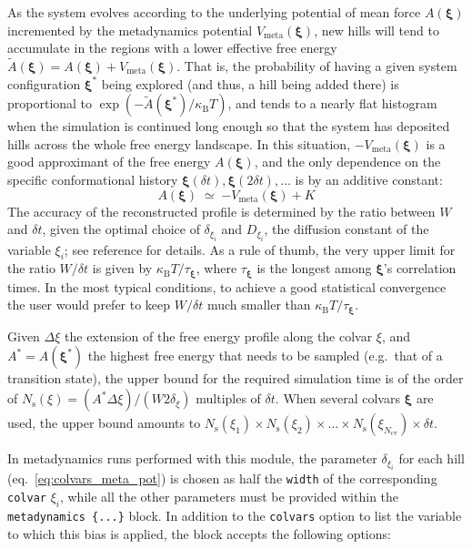 As the system evolves according to the underlying potential of mean
force $A(\bm{\xi})$ incremented by the metadynamics potential
$V_{\mathrm{meta}}(\bm{\xi})$, new hills will tend to accumulate in
the regions with a lower effective free energy $\tilde{A}(\bm{\xi}) =
A(\bm{\xi})+V_{\mathrm{meta}}(\bm{\xi})$.  That is, the probability of
having a given system configuration $\bm{\xi^{*}}$ being explored (and
thus, a hill being added there) is proportional to
$\exp\left(-\tilde{A}(\bm{\xi^{*}})/\kappa_{\mathrm{B}}T\right)$, and
tends to a nearly flat histogram when the simulation is continued long
enough so that the system has deposited hills across the whole free
energy landscape.  In this situation, $-V_{\mathrm{meta}}(\bm{\xi})$
is a good approximant of the free energy $A(\bm{\xi})$, and the only
dependence on the specific conformational history
$\bm{\xi}(\delta{}t), \bm{\xi}(2\delta{}t), \ldots$ is by an additive
constant:
\begin{equation}
  \label{eq:colvars_meta_fes}
  A(\bm{\xi}) \; \simeq \; {
    -V_{\mathrm{meta}}(\bm{\xi}) + K
  }
\end{equation}
The accuracy of the reconstructed profile is determined by the ratio
between $W$ and $\delta{}t$, given the optimal choice of
$\delta_{\xi_{i}}$ and $D_{\xi_{i}}$, the diffusion constant of the
variable $\xi_{i}$; see reference \cite{Bussi2006} for details.  As a
rule of thumb, the very upper limit for the ratio $W/\delta{}t$ is
given by $\kappa_{\mathrm{B}}T/\tau_{\bm{\xi}}$, where
$\tau_{\bm{\xi}}$ is the longest among $\bm{\xi}$'s correlation times.
In the most typical conditions, to achieve a good statistical
convergence the user would prefer to keep $W/\delta{}t$ much smaller
than $\kappa_{\mathrm{B}}T/\tau_{\bm{\xi}}$.

Given $\Delta\xi$ the extension of the free energy profile along the
colvar $\xi$, and $A^{*}=A(\bm{\xi}^{*})$ the highest free energy that
needs to be sampled (e.g.~that of a transition state), the upper bound
for the required simulation time is of the order of
$N_{\mathrm{s}}(\xi) = (A^{*}\Delta\xi)/(W2\delta_{\xi})$ multiples of
$\delta{}t$.  When several colvars $\bm{\xi}$ are used, the upper
bound amounts to $N_{\mathrm{s}}(\xi_{1}) \times
N_{\mathrm{s}}(\xi_{2}) \times \ldots \times
N_{\mathrm{s}}(\xi_{N_{\mathrm{cv}}}) \times \delta{}t$.

In metadynamics runs performed with this module, the parameter
$\delta_{\xi_{i}}$ for each hill (eq.~\ref{eq:colvars_meta_pot}) is
chosen as half the \texttt{width} of the corresponding \texttt{colvar}
$\xi_{i}$, while all the other parameters must be provided within the
\texttt{metadynamics~\{...\}} block.  In addition to the
\texttt{colvars} option to list the variable to which this bias is
applied, the block accepts the following options:

